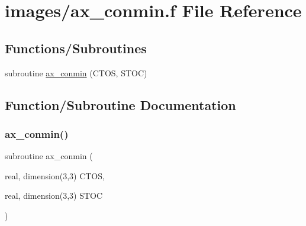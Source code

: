 \hypertarget{ax__conmin_8f}{}\section{images/ax\+\_\+conmin.f File Reference}
\label{ax__conmin_8f}
\subsection*{Functions/\+Subroutines}
\begin{DoxyCompactItemize}
\item 
subroutine \hyperlink{ax__conmin_8f_a30e500c1d028e2e57f168639f05a1261}{ax\+\_\+conmin} (C\+T\+OS, S\+T\+OC)
\end{DoxyCompactItemize}


\subsection{Function/\+Subroutine Documentation}
\mbox{\label{ax__conmin_8f_a30e500c1d028e2e57f168639f05a1261}} 
\subsubsection{\texorpdfstring{ax\+\_\+conmin()}{ax\_conmin()}}
{\footnotesize\ttfamily subroutine ax\+\_\+conmin (\begin{DoxyParamCaption}\item[{real, dimension(3,3)}]{C\+T\+OS,  }\item[{real, dimension(3,3)}]{S\+T\+OC }\end{DoxyParamCaption})}

